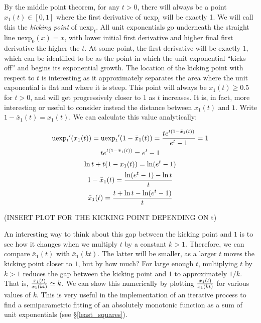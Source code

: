 \documentclass[12pt,a4paper]{article}
\newcommand{\uexp}[1] {{\text{uexp}_{#1}}}
\begin{document}
By the middle point theorem, for any $t > 0$, there will always be a point $x_1(t) \in [0,1]$ where the first derivative of $\uexp{t}$ will be exactly 1. We will call this the {\emph{kicking point}} of $\uexp{t}$. All unit exponentials go underneath the straight line $\uexp{0}(x) = x$, with lower initial first derivative and higher final first derivative the higher the $t$. At some point, the first derivative will be exactly $1$, which can be identified to be as the point in which the unit exponential ``kicks off'' and begins its exponential growth. The location of the kicking point with respect to $t$ is interesting as it approximately separates the area where the unit exponential is flat and where it is steep. This point will always be $x_1(t) \geq 0.5$ for $t > 0$, and will get progressively closer to $1$ as $t$ increases. It is, in fact, more interesting or useful to consider instead the distance between $x_1(t)$ and $1$. Write $1 - {\bar{x}}_1(t) = x_1(t)$. We can calculate this value analytically:

\begin{multline}
\uexp{t}^{\prime}(x_1(t)) = \uexp{t}^{\prime}(1 - {\bar{x}}_1(t)) = {{t e^{t (1 - {\bar{x}}_1(t))}} \over {e^t - 1}} = 1\\
t e^{t (1 - {\bar{x}}_1(t))} = e^t - 1\\
\ln t + t (1 - {\bar{x}}_1(t)) = \ln (e^t - 1)\\
1 - {\bar{x}}_1(t) = {{\ln (e^t - 1) - \ln t} \over {t}}\\
{\bar{x}}_1(t) = {{t + \ln t - \ln (e^t - 1)} \over {t}}\\
\end{multline}

(INSERT PLOT FOR THE KICKING POINT DEPENDING ON t)

An interesting way to think about this gap between the kicking point and $1$ is to see how it changes when we multiply $t$ by a constant $k > 1$. Therefore, we can compare ${\bar{x}}_1(t)$ with ${\bar{x}}_1(kt)$. The latter will be smaller, as a larger $t$ moves the kicking point closer to $1$, but by how much? For large enough $t$, multiplying $t$ by $k > 1$ reduces the gap between the kicking point and $1$ to approximately $1/k$. That is, ${{{\bar{x}}_1(t)} \over {{\bar{x}}_1(kt)}} \simeq k$. We can show this numerically by plotting ${{{\bar{x}}_1(t)} \over {{\bar{x}}_1(kt)}}$ for various values of $k$. This is very useful in the implementation of an iterative process to find a semiparametric fitting of an absolutely monotonic function as a sum of unit exponentials (see \S \ref{least_squares}).
\end{document}
